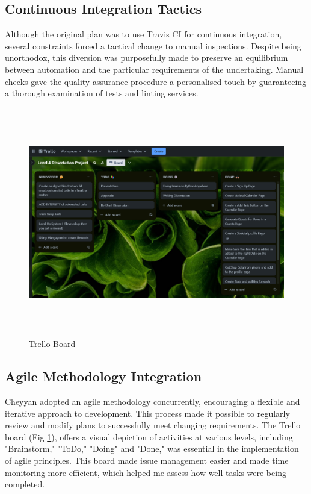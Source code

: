 \documentclass{l4proj}
\begin{document}
\subsection{Continuous Integration Tactics}
Although the original plan was to use Travis CI for continuous integration, several constraints forced a tactical change to manual inspections. Despite being unorthodox, this diversion was purposefully made to preserve an equilibrium between automation and the particular requirements of the undertaking. Manual checks gave the quality assurance procedure a personalised touch by guaranteeing a thorough examination of tests and linting services.

\begin{figure}[h]
    \centering
    \includegraphics[height=10cm]{images/trello.png}
    \caption{Trello Board}
    \label{fig:Trello}
\end{figure}

\subsection{Agile Methodology Integration}
Cheyyan adopted an agile methodology concurrently, encouraging a flexible and iterative approach to development. This process made it possible to regularly review and modify plans to successfully meet changing requirements. The Trello board (Fig \ref{fig:Trello}), offers a visual depiction of activities at various levels, including "Brainstorm," "ToDo," "Doing" and "Done," was essential in the implementation of agile principles. This board made issue management easier and made time monitoring more efficient, which helped me assess how well tasks were being completed.
\end{document}
